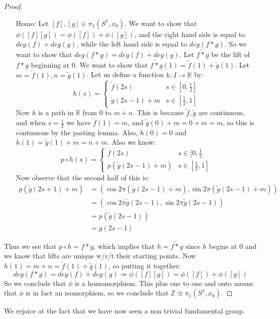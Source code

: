 \begin{proof}
\begin{itemize}
\item[Homo:]
Let $[f],[g]\in \pi_1(S^1, x_0)$. We want to show that $\phi([f][g])=\phi([f])+\phi([g])$, and the right hand side is equal to $deg(f)+deg(g)$, while the left hand side is equal to $deg(f\ast g)$. So we want to show that $deg(f\ast g)=deg(f)+deg(g)$. Let $\widetilde{f\ast g}$ be the lift of $f\ast g$ beginning at $0$. We want to show that $\widetilde{f\ast g}(1)=\tilde{f}(1)+\tilde{g}(1)$. Let $m=\tilde{f}(1), n=\tilde{g}(1)$. Let us define a function $h\colon I\to \mathbb{R}$ by:
	\[h(s)=\begin{cases}
	\tilde{f}(2s) & s\in [0,\frac{1}{2}]\\
	\tilde{g}(2s-1)+m & s\in [\frac{1}{2},1]
	\end{cases}
\]
Now $h$ is a path in $\mathbb{R}$ from $0$ to $m+n$. This is because $\tilde{f}, \tilde{g}$ are continuous, and when $s=\frac{1}{2}$ we have $\tilde{f}(1)=m$, and $\tilde{g}(0)+m=0+m=m$, so this is continuous by the pasting lemma. Also, $h(0)=0$ and $h(1)=\tilde{g}(1)+m=n+m$. Also we know:
	\[p\circ h(s)=\begin{cases}
	f(2s) & s\in [0,\frac{1}{2}\\
	p(\tilde{g}(2s-1)+m) & s\in [\frac{1}{2},1]
	\end{cases}
\]
Now observe that the second half of this is:
\begin{align*}
	p(\tilde{g}(2s+1)+m)&=(\cos 2\pi (\tilde{g}(2s-1)+m), \sin2\pi (\tilde{g}(2s-1)+m))\\
											&=(\cos 2\pi \tilde{g}(2s-1),\sin2\pi \tilde{g}(2s-1))\\
											&=p(\tilde{g}(2s-1))\\
											&=g(2s-1)						
\end{align*}
\end{itemize}
Thus we see that $p\circ h=f\ast g$, which implies that $h=\widetilde{f\ast g}$ since $h$ begins at $0$ and we know that lifts are unique w/r/t their starting points. Now $h(1)=m+n=\tilde{f}(1)+\tilde{g}(1)$, so putting it together:
	\[deg(f\ast g)=deg(f)+deg(g)\Rightarrow \phi([f][g])=\phi([f])+\phi([g])\]
So we conclude that $\phi$ is a homomorphism. This plus one to one and onto means that $\phi$ is in fact an isomorphism, so we conclude that $\mathbb{Z}\cong \pi_1(S^1,x_0)$.
\end{proof}
We rejoice at the fact that we have now seen a non trivial fundamental group. 

